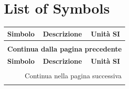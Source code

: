 \chapter*{List of Symbols}

\begin{longtable}{p{} p{} p{}}
    \textbf{Simbolo} & \textbf{Descrizione} & \textbf{Unità SI} \\\hline\\[-9px]
    \endfirsthead

    \multicolumn{3}{c}{{\bfseries Continua dalla pagina precedente}} \\[1ex]
    \textbf{Simbolo} & \textbf{Descrizione} & \textbf{Unità SI} \\\hline\\[-9px]
    \endhead

    \hline
    \multicolumn{3}{r}{{Continua nella pagina successiva}} \\
    \endfoot


\end{longtable}
